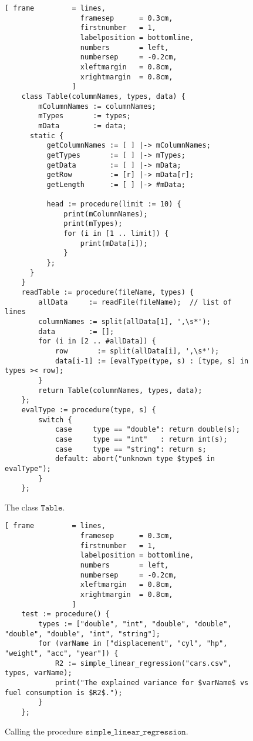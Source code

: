 \begin{figure}[!ht]
\centering
\begin{Verbatim}[ frame         = lines, 
                  framesep      = 0.3cm, 
                  firstnumber   = 1,
                  labelposition = bottomline,
                  numbers       = left,
                  numbersep     = -0.2cm,
                  xleftmargin   = 0.8cm,
                  xrightmargin  = 0.8cm,
                ]
    class Table(columnNames, types, data) {
        mColumnNames := columnNames;
        mTypes       := types;
        mData        := data;
      static {
          getColumnNames := [ ] |-> mColumnNames;
          getTypes       := [ ] |-> mTypes;
          getData        := [ ] |-> mData;
          getRow         := [r] |-> mData[r];
          getLength      := [ ] |-> #mData;
          
          head := procedure(limit := 10) {
              print(mColumnNames);
              print(mTypes);
              for (i in [1 .. limit]) {
                  print(mData[i]);
              }
          };
      }
    }
    readTable := procedure(fileName, types) {
        allData     := readFile(fileName);  // list of lines
        columnNames := split(allData[1], ',\s*');
        data        := [];
        for (i in [2 .. #allData]) {
            row       := split(allData[i], ',\s*');
            data[i-1] := [evalType(type, s) : [type, s] in types >< row];
        }
        return Table(columnNames, types, data);
    };
    evalType := procedure(type, s) {
        switch {
            case     type == "double": return double(s);
            case     type == "int"   : return int(s);
            case     type == "string": return s;
            default: abort("unknown type $type$ in evalType");
        }
    };
\end{Verbatim}
\vspace*{-0.3cm}
\caption{The class $\mathtt{Table}$.}
\label{fig:table.stlx}
\end{figure}
\pagebreak

\begin{figure}[!ht]
\centering
\begin{Verbatim}[ frame         = lines, 
                  framesep      = 0.3cm, 
                  firstnumber   = 1,
                  labelposition = bottomline,
                  numbers       = left,
                  numbersep     = -0.2cm,
                  xleftmargin   = 0.8cm,
                  xrightmargin  = 0.8cm,
                ]
    test := procedure() {
        types := ["double", "int", "double", "double", "double", "double", "int", "string"];
        for (varName in ["displacement", "cyl", "hp", "weight", "acc", "year"]) {
            R2 := simple_linear_regression("cars.csv", types, varName);
            print("The explained variance for $varName$ vs fuel consumption is $R2$."); 
        }
    };
\end{Verbatim}
\vspace*{-0.3cm}
\caption{Calling the procedure $\mathtt{simple\_linear\_regression}$.}
\label{fig:simple-linear-regression.stlx:test}
\end{figure}

